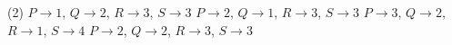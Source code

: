 \begin{tasks}(2)
    \task $P \rightarrow 1$, $Q \rightarrow 2$, $R \rightarrow 3$, $S \rightarrow 3$
    \task $P \rightarrow 2$, $Q \rightarrow 1$, $R \rightarrow 3$, $S \rightarrow 3$
    \task $P \rightarrow 3$, $Q \rightarrow 2$, $R \rightarrow 1$, $S \rightarrow 4$
    \task $P \rightarrow 2$, $Q \rightarrow 2$, $R \rightarrow 3$, $S \rightarrow 3$
\end{tasks}
